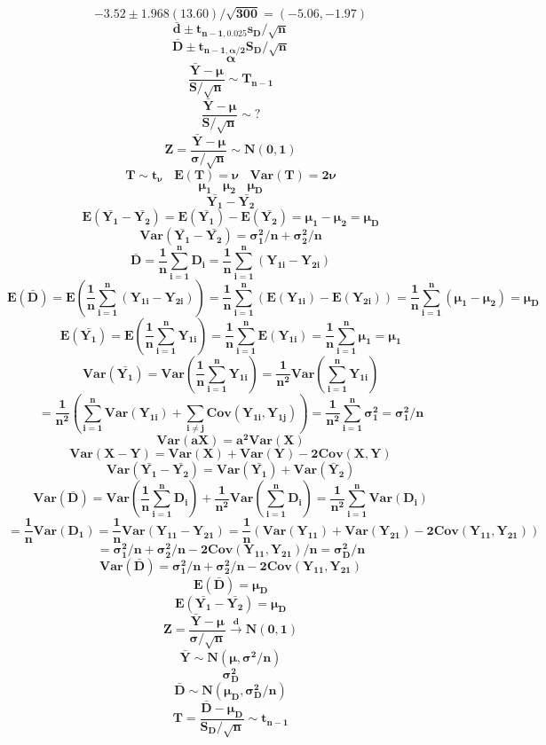 \documentclass[12pt,portrait,semhelv,semrot]{article}
\begin{document}
{{$$\boldsymbol{-3.52\pm 1.968(13.60)/\sqrt{300} = (-5.06, -1.97)}$$
$$\boldsymbol{\bar{d}\pm t_{n-1,0.025}s_D/\sqrt{n}}$$
$$\boldsymbol{\bar{D}\pm t_{n-1,\alpha/2}S_D/\sqrt{n}}$$
$$\boldsymbol{\alpha}$$
		$$\boldsymbol{\frac{\bar{Y}-\mu}{S/\sqrt{n}} \sim T_{n-1}}$$			$$\boldsymbol{\frac{\bar{Y}-\mu}{S/\sqrt{n}} \sim ?}$$		
		$$\boldsymbol{Z = \frac{\bar{Y}-\mu}{\sigma/\sqrt{n}} \sim N(0,1)}$$
$$\boldsymbol{T \sim t_{\nu}~~~~E(T) = \nu~~~~Var(T) = 2\nu}$$
$$\boldsymbol{\mu_1~~~~\mu_2~~~~\mu_D}$$
$$\boldsymbol{\bar{Y_1}-\bar{Y_2}}$$
$$\boldsymbol{E\left(\bar{Y_1}-\bar{Y_2}\right)= E\left(\bar{Y_1}\right) - E\left(\bar{Y_2}\right) = \mu_1-\mu_2 = \mu_D}$$
$$\boldsymbol{Var\left(\bar{Y_1}-\bar{Y_2}\right)= \sigma_1^2/n+\sigma^2_2/n}$$
$$\boldsymbol{\bar{D} = \frac{1}{n}\sum_{i=1}^{n}D_i = \frac{1}{n}\sum_{i=1}^{n}(Y_{1i}-Y_{2i})}$$ 
$$\boldsymbol{E\left(\bar{D}\right) = E\left(\frac{1}{n}\sum_{i=1}^{n}(Y_{1i}-Y_{2i})\right) = \frac{1}{n}\sum_{i=1}^{n}\left(E\left(Y_{1i}\right)-E\left(Y_{2i}\right)\right) = \frac{1}{n}\sum_{i=1}^{n}(\mu_1-\mu_2) = \mu_D}$$
$$\boldsymbol{E\left(\bar{Y_1}\right) = E\left(\frac{1}{n}\sum_{i=1}^{n}Y_{1i}\right) = \frac{1}{n}\sum_{i=1}^{n}E(Y_{1i}) = \frac{1}{n}\sum_{i=1}^{n}\mu_1 = \mu_1}$$
$$\boldsymbol{Var\left(\bar{Y_1}\right) = Var\left(\frac{1}{n}\sum_{i=1}^{n}Y_{1i}\right) = \frac{1}{n^2}Var\left(\sum_{i=1}^{n}Y_{1i}\right)}$$
$$\boldsymbol{= \frac{1}{n^2}\left(\sum_{i=1}^{n}Var(Y_{1i}) + \sum_{i\neq j} Cov(Y_{1i}, Y_{1j})\right) = \frac{1}{n^2}\sum_{i=1}^{n}\sigma_1^2 = \sigma_1^2/n}$$
$$\boldsymbol{Var(aX) = a^2 Var(X)}$$
$$\boldsymbol{Var(X-Y) = Var(X) + Var(Y) -2Cov(X,Y)}$$
$$\boldsymbol{Var\left(\bar{Y_1}-\bar{Y_2}\right) = Var\left(\bar{Y_1}\right) + Var\left(\bar{Y}_2\right)}$$
$$\boldsymbol{Var\left(\bar{D}\right) = Var\left(\frac{1}{n}\sum_{i=1}^{n}D_i\right) + \frac{1}{n^2}Var\left(\sum_{i=1}^{n}D_i\right)= \frac{1}{n^2}\sum_{i=1}^{n}Var(D_i)}$$
$$\boldsymbol{ = \frac{1}{n}Var(D_1) = \frac{1}{n}Var(Y_{11}-Y_{21}) = \frac{1}{n}\left(Var(Y_{11})+Var(Y_{21}) -2Cov(Y_{11}, Y_{21})\right)}$$
$$\boldsymbol{ = \sigma^2_1/n+\sigma^2_2/n-2Cov(Y_{11},Y_{21})/n = \sigma^2_D/n}$$
$$\boldsymbol{Var\left(\bar{D}\right) = \sigma^2_1/n+\sigma^2_2/n-2Cov(Y_{11},Y_{21})}$$
$$\boldsymbol{E\left(\bar{D}\right) = \mu_D}$$
$$\boldsymbol{E\left(\bar{Y_1}-\bar{Y_2}\right) = \mu_D}$$
$$\boldsymbol{Z = \frac{\bar{Y}-\mu}{\sigma/\sqrt{n}}\stackrel{d}\rightarrow N(0, 1)}$$
$$\boldsymbol{\bar{Y}\sim N(\mu, \sigma^2/n)}$$
$$\boldsymbol{\sigma^2_D}$$
$$\boldsymbol{\bar{D}\sim N(\mu_D, \sigma_D^2/n)}$$
$$\boldsymbol{T = \frac{\bar{D}-\mu_D}{S_D/\sqrt{n}}\sim t_{n-1}}$$
}
}
\end{document}
